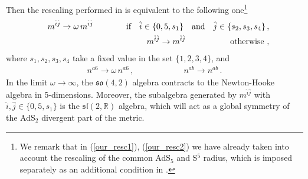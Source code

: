 \documentclass[12pt]{article}
\numberwithin{equation}{section}
\begin{document}
\begin{appendices}
Then the rescaling performed in \cite{Gomis:2005pg} is equivalent to the following one\footnote{We remark that in (\ref{our_resc1}), (\ref{our_resc2}) we have already taken into account the rescaling of the common AdS$_5$ and S$^5$ radius, which is imposed separately as an additional condition in \cite{Gomis:2005pg}.} 
\begin{eqnarray}
\label{our_resc1}
&&m^{\hat{i}\hat{j}} \rightarrow \omega \, m^{\hat{i}\hat{j}} \qquad\qquad \text{if} \quad \hat{i} \in \{ 0, 5, s_1 \} \quad \text{and} \quad \hat{j} \in \{s_2,s_3,s_4 \} \, , \\
\label{our_resc2}
&&m^{\hat{i}\hat{j}} \rightarrow  m^{\hat{i}\hat{j}}\hspace{1.9cm} \text{otherwise} \ ,  
\end{eqnarray}
where $s_1, s_2, s_3, s_4$ take a fixed value in the set $\{1, 2, 3, 4\}$, and
\begin{eqnarray}
\label{our_resc3}
n^{a 6} \rightarrow  \omega \, n^{a 6} \, , \qquad\qquad\qquad
n^{ab} \rightarrow n^{ab} \, . 
\end{eqnarray}
In the limit $\omega \rightarrow \infty$, the $\mathfrak{so}(4,2)$ algebra contracts to the Newton-Hooke algebra in 5-dimensions. Moreover, the subalgebra generated by $m^{\hat{i}\hat{j}}$ with $\hat{i}, \hat{j} \in \{ 0, 5, s_1 \} $ is the $\mathfrak{sl}(2, \mathbb{R})$ algebra, which will act as a global symmetry of the AdS$_2$ divergent part of the metric. 



\end{appendices}
\end{document}
